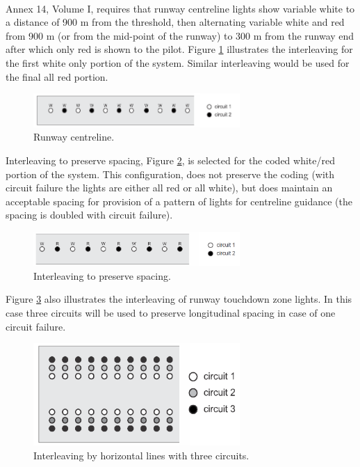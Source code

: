 		\paragraph{} Annex 14, Volume I, requires that runway centreline lights show variable white to a distance of 900 m from the threshold, then alternating variable white and red from 900 m (or from the mid-point of the runway) to 300 m from the runway end after which only red is shown to the pilot. Figure \ref{rnwCentre} illustrates the interleaving for the first white only portion of the system. Similar interleaving would be used for the final all red portion.		
		
		\begin{figure}[H]
			\centering
			\includegraphics[clip, trim=0cm 0cm 0cm 0cm, width=0.7\textwidth]{./images/electric/rnwCentre}
			\caption{Runway centreline.}
			\label{rnwCentre}
		\end{figure}
		
		Interleaving to preserve spacing, Figure \ref{spacing}, is selected for the coded white/red portion of the system. This configuration, does not preserve the coding (with circuit failure the lights are either all red or all white), but does maintain an acceptable spacing for provision of a pattern of lights for centreline guidance (the spacing is doubled with circuit failure).
		
		\begin{figure}[H]
			\centering
			\includegraphics[clip, trim=0cm 0cm 0cm 0cm, width=0.7\textwidth]{./images/electric/spacing}
			\caption{Interleaving to preserve spacing.}
			\label{spacing}
		\end{figure}
	
		Figure \ref{touchdown} also illustrates the interleaving of runway touchdown zone lights. In this case three circuits will be used to preserve longitudinal spacing in case of one circuit failure.	
		\begin{figure}[H]
			\centering
			\includegraphics[clip, trim=0cm 0cm 0cm 0cm, width=0.7\textwidth]{./images/electric/touchdown}
			\caption{Interleaving by horizontal lines with three circuits.}
			\label{touchdown}
		\end{figure}
		
